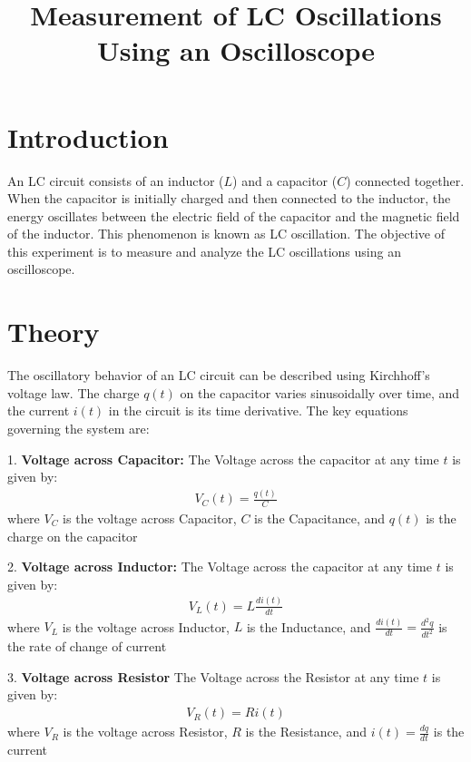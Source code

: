 \documentclass[a4paper,12pt]{article}
\title{Measurement of LC Oscillations Using an Oscilloscope}
\author{}
\date{}
\begin{document}
\maketitle

\tableofcontents
\newpage

\section{Introduction}
An LC circuit consists of an inductor (\(L\)) and a capacitor (\(C\)) connected together. When the capacitor is initially charged and then connected to the inductor, the energy oscillates between the electric field of the capacitor and the magnetic field of the inductor. This phenomenon is known as LC oscillation. The objective of this experiment is to measure and analyze the LC oscillations using an oscilloscope.

\section{Theory}

The oscillatory behavior of an LC circuit can be described using Kirchhoff's voltage law. The charge \(q(t)\) on the capacitor varies sinusoidally over time, and the current \(i(t)\) in the circuit is its time derivative. The key equations governing the system are:

1. \textbf{Voltage across Capacitor:}
   The Voltage across the capacitor at any time \(t\) is given by:
  \begin{align*}
    V_C(t) = \frac{q(t)}{C}  
  \end{align*}
   where \(V_C\) is the voltage across Capacitor, $C$ is the Capacitance, and $q(t)$ is the charge on the capacitor

2. \textbf{Voltage across Inductor:}
  The Voltage across the capacitor at any time \(t\) is given by:
  \begin{align*}
    V_L(t) = L\frac{di(t)}{dt}  
  \end{align*}
  where \(V_L\) is the voltage across Inductor, $L$ is the Inductance, and $\frac{di(t)}{dt} = \frac{d^2q}{dt^2}$ is the rate of change of current

3. \textbf{Voltage across Resistor}
  The Voltage across the Resistor at any time \(t\) is given by:
  \begin{align*}
    V_R(t) = Ri(t)  
  \end{align*}
  where \(V_R\) is the voltage across Resistor, $R$ is the Resistance, and $i(t) = \frac{dq}{dt}$ is the current
\end{document}
